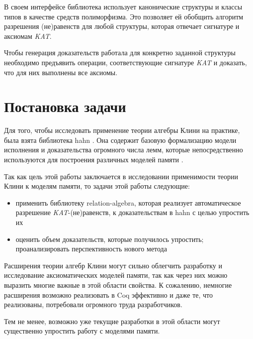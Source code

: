 \documentclass[times
              ,specification
              ,annotation
              ]{itmo-student-thesis}
\begin{document}
      В своем интерфейсе библиотека использует канонические структуры и классы типов
      \cite{canonical_structures} в качестве средств полиморфизма. Это позволяет ей обобщить алгоритм
      разрешения (не)равенств для любой структуры, которая отвечает сигнатуре и аксиомам \textit{KAT}.
      
      Чтобы генерация доказательств работала для конкретно заданной структуры необходимо предъявить
      операции, соответствующие сигнатуре \textit{KAT} и доказать, что для них выполнены все аксиомы.

\finishrelatedwork

  \section{Постановка задачи}


    Для того, чтобы исследовать применение теории алгебры Клини на практике, была взята библиотека hahn \cite{hahn}.
    Она содержит базовую формализацию модели исполнения и доказательства огромного числа лемм, которые
    непосредственно используются для построения различных моделей памяти \cite{imm}.

    Так как цель этой работы заключается в исследовании применимости теории Клини к моделям памяти,
    то задачи этой работы следующие:
    \begin{itemize}
      \item применить библиотеку relation-algebra, которая реализует автоматическое разрешение
        \textit{KAT}-(не)равенств, к доказательствам в hahn с целью упростить их
      \item оценить объем доказательств, которые получилось упростить; проанализировать
        перспективность нового метода
    \end{itemize}

  \chapterconclusion
    Расширения теории алгебр Клини могут сильно облегчить разработку и исследование аксиоматических моделей памяти,
    так как через них можно выразить многие важные в этой области свойства. К сожалению, немногие
    расширения возможно реализовать в Coq эффективно и даже те, что реализованы, потребовали огромного труда разработчиков.

    Тем не менее, возможно уже текущие разработки в этой области могут существенно упростить
    работу с моделями памяти.
\end{document}
